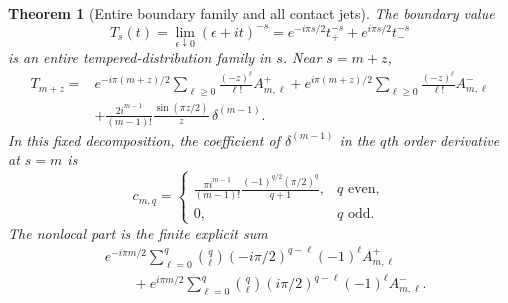 \documentclass[11pt,letterpaper]{article}
\newtheorem{theorem}{Theorem}[section]
\theoremstyle{definition}\newtheorem{definition}[theorem]{Definition}
\theoremstyle{remark}\newtheorem{remark}[theorem]{Remark}
\begin{document}
\begin{theorem}[Entire boundary family and all contact jets]\label{mr:thm:contact}
The boundary value
\begin{equation}\label{mr:eq:T}
 T_s(t)=\lim_{\epsilon\downarrow0}(\epsilon+it)^{-s}
 =e^{-i\pi s/2}t_+^{-s}+e^{i\pi s/2}t_-^{-s}
\end{equation}
is an entire tempered-distribution family in $s$. Near $s=m+z$,
\begin{align}
 T_{m+z}={}&e^{-i\pi(m+z)/2}
       \sum_{\ell\ge0}\frac{(-z)^\ell}{\ell!}A_{m,\ell}^+
 +e^{i\pi(m+z)/2}
       \sum_{\ell\ge0}\frac{(-z)^\ell}{\ell!}A_{m,\ell}^-\nonumber\\
 &+\frac{2i^{m-1}}{(m-1)!}\frac{\sin(\pi z/2)}z\,
       \delta^{(m-1)}.
 \label{mr:eq:contactgerm}
\end{align}
In this fixed decomposition, the coefficient of $\delta^{(m-1)}$ in
the $q$th order derivative at $s=m$ is
\begin{equation}\label{mr:eq:contactcoef}
 c_{m,q}=\begin{cases}
 \displaystyle\frac{\pi i^{m-1}}{(m-1)!}
      \frac{(-1)^{q/2}(\pi/2)^q}{q+1},&q\text{ even},\\[5pt]
 0,&q\text{ odd}.
 \end{cases}
\end{equation}
The nonlocal part is the finite explicit sum
\begin{align}
 &e^{-i\pi m/2}\sum_{\ell=0}^q\binom q\ell
       (-i\pi/2)^{q-\ell}(-1)^\ell A_{m,\ell}^+\nonumber\\
 &\qquad+e^{i\pi m/2}\sum_{\ell=0}^q\binom q\ell
       (i\pi/2)^{q-\ell}(-1)^\ell A_{m,\ell}^-.
 \label{mr:eq:contactnonlocal}
\end{align}
\end{theorem}
\end{document}
